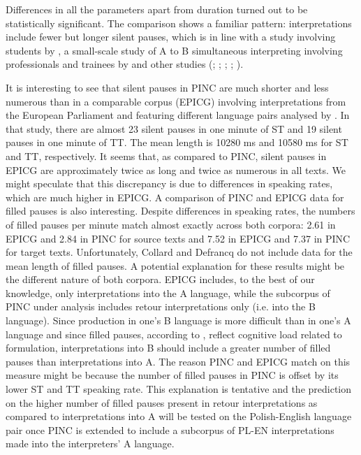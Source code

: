\documentclass[output=paper]{langscibook}
\begin{document}
\newpage
Differences in all the parameters apart from duration turned out to be statistically significant. The comparison shows a familiar pattern: interpretations include fewer but longer silent pauses, which is in line with a study involving students by \citet{Tissi2000}, a small-scale study of A to B simultaneous interpreting involving professionals and trainees by \citet{WangLi2014} and other studies (\citealt{Ahrens2005}; \citealt{Christodoulides2013}; \citealt{CollardDefrancq2019}; \citealt{Lee1999}; \citealt{Poechhacker1995}). 

It is interesting to see that silent pauses in PINC are much shorter and less numerous than in a comparable corpus (EPICG) involving interpretations from the European Parliament and featuring different language pairs analysed by \citet{CollardDefrancq2019}. In that study, there are almost 23 silent pauses in one minute of ST and 19 silent pauses in one minute of TT. The mean length is 10280 ms and 10580 ms for ST and TT, respectively. It seems that, as compared to PINC, silent pauses in EPICG are approximately twice as long and twice as numerous in all texts. We might speculate that this discrepancy is due to differences in speaking rates, which are much higher in EPICG. A comparison of PINC and EPICG data for filled pauses is also interesting. Despite differences in speaking rates, the numbers of filled pauses per minute match almost exactly across both corpora: 2.61 in EPICG and 2.84 in PINC for source texts and 7.52 in EPICG and 7.37 in PINC for target texts. Unfortunately, Collard and Defrancq do not include data for the mean length of filled pauses. A potential explanation for these results might be the different nature of both corpora. EPICG includes, to the best of our knowledge, only interpretations into the A language, while the subcorpus of PINC under analysis includes retour interpretations only (i.e. into the B language). Since production in one’s B language is more difficult than in one’s A language and since filled pauses, according to \citet{Setton1999}, reflect cognitive load related to formulation, interpretations into B should include a greater number of filled pauses than interpretations into A. The reason PINC and EPICG match on this measure might be because the number of filled pauses in PINC is offset by its lower ST and TT speaking rate. This explanation is tentative and the prediction on the higher number of filled pauses present in retour interpretations as compared to interpretations into A will be tested on the Polish-English language pair once PINC is extended to include a subcorpus of PL-EN interpretations made into the interpreters’ A language.
\end{document}
